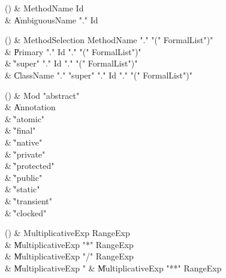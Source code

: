 \begin{bbgrammarappendix}

() & MethodName \label{prod:MethodName}  \: Id  \\

 &    \| AmbiguousName \xcd"." Id \\

\end{bbgrammarappendix}

\begin{bbgrammarappendix}

() & MethodSelection \label{prod:MethodSelection}  \: MethodName \xcd"." \xcd"(" FormalList\opt \xcd")"  \\

 &    \| Primary \xcd"." Id \xcd"." \xcd"(" FormalList\opt \xcd")" \\
 &    \| \xcd"super" \xcd"." Id \xcd"." \xcd"(" FormalList\opt \xcd")" \\
 &    \| ClassName \xcd"." \xcd"super"  \xcd"." Id \xcd"." \xcd"(" FormalList\opt \xcd")" \\

\end{bbgrammarappendix}

\begin{bbgrammarappendix}

() & Mod \label{prod:Mod}  \: \xcd"abstract"  \\

 &    \| Annotation \\
 &    \| \xcd"atomic" \\
 &    \| \xcd"final" \\
 &    \| \xcd"native" \\
 &    \| \xcd"private" \\
 &    \| \xcd"protected" \\
 &    \| \xcd"public" \\
 &    \| \xcd"static" \\
 &    \| \xcd"transient" \\
 &    \| \xcd"clocked" \\

\end{bbgrammarappendix}

\begin{bbgrammarappendix}

() & MultiplicativeExp \label{prod:MultiplicativeExp}  \: RangeExp  \\

 &    \| MultiplicativeExp \xcd"*" RangeExp \\
 &    \| MultiplicativeExp \xcd"/" RangeExp \\
 &    \| MultiplicativeExp \xcd"%
 &    \| MultiplicativeExp \xcd"**" RangeExp \\

\end{bbgrammarappendix}

